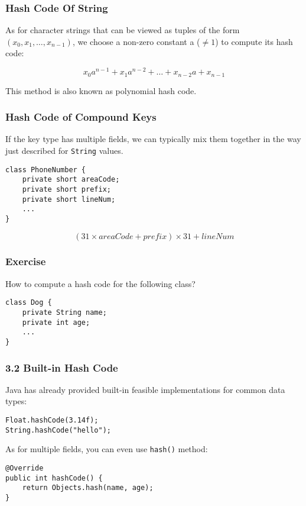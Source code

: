 \documentclass[aspectratio=169, 14pt]{beamer}
\begin{document}
\begin{frame}
	\frametitle{Hash Code Of String}
	As for character strings that can be viewed as tuples of the form $(x_0, x_1, \dots, x_{n-1})$, we choose a non-zero constant a ($\neq 1$) to compute its hash code:

	\[x_0a^{n-1} + x_1a^{n-2} + \dots + x_{n-2}a + x_{n-1} \]

	This method is also known as \alert{polynomial hash code}.
\end{frame}

\begin{frame}[fragile]
	\frametitle{Hash Code of Compound Keys}
	If the key type has multiple fields, we can typically mix them together in the way just described for \texttt{String} values.

	\begin{verbatim}
class PhoneNumber {
    private short areaCode;
    private short prefix;
    private short lineNum;
    ...
}    
\end{verbatim}
	\[(31 \times areaCode + prefix) \times 31 + lineNum \]
\end{frame}

\begin{frame}[fragile]
	\frametitle{Exercise}
	How to compute a hash code for the following class?

	\begin{verbatim}
class Dog {
    private String name;
    private int age;
    ...
}    
\end{verbatim}

\end{frame}

\begin{frame}[fragile]
	\frametitle{3.2 Built-in Hash Code}
	Java has already provided built-in feasible implementations for common data types:

	\begin{verbatim}
Float.hashCode(3.14f);
String.hashCode("hello");
\end{verbatim}
	As for multiple fields, you can even use \texttt{hash()} method:
	\begin{verbatim}
@Override
public int hashCode() {
    return Objects.hash(name, age);
}
\end{verbatim}

\end{frame}
\end{document}
